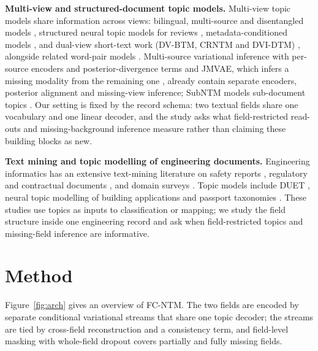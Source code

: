 \documentclass[Journal,letterpaper,NoLists]{ascelike-new}
\newcommand{\fcntm}{FC-NTM}
\begin{document}
\noindent\textbf{Multi-view and structured-document topic models.} Multi-view topic models share information across views: bilingual, multi-source and disentangled
models \cite{kurle2019multisource,zhang2017robust,pergola2021disentangled,liu2022dualview},
structured neural topic models for reviews \cite{esmaeili2019structured}, metadata-conditioned
models \cite{card2018metadata,roberts2019stm}, and dual-view short-text work (DV-BTM, CRNTM and
DVI-DTM) \cite{liu2022dualview,crntm2020,dvidtm2026}, alongside related word-pair models
\cite{relationalbtm2018,sparsebtm2021}. Multi-source variational inference with per-source encoders
and posterior-divergence terms \cite{kurle2019multisource} and JMVAE, which infers a missing
modality from the remaining one \cite{suzuki2017jmvae}, already contain separate encoders,
posterior alignment and missing-view inference; SubNTM models sub-document topics
\cite{nguyen2026subntm}. Our setting is fixed by the record schema: two textual fields share one
vocabulary and one linear decoder, and the study asks what field-restricted read-outs and
missing-background inference measure rather than claiming these building blocks as new.

\noindent\textbf{Text mining and topic modelling of engineering documents.} Engineering informatics has an extensive text-mining literature on safety reports
\cite{civilsafety2015,civilaccident2018}, regulatory and contractual documents
\cite{compliance2013,ontology2015,contract2022,risknlp2023}, and domain surveys
\cite{civilnlp2021,civilnlp2023}. Topic models include DUET \cite{duet2019}, neural topic modelling
of building applications \cite{civiltopic2024} and passport taxonomies \cite{passport2026}. These
studies use topics as inputs to classification or mapping; we study the field structure inside one
engineering record and ask when field-restricted topics and missing-field inference are
informative.

\section{Method}

Figure~\ref{fig:arch} gives an overview of \fcntm{}. The two fields are encoded by separate
conditional variational streams that share one topic decoder; the streams are tied by cross-field
reconstruction and a consistency term, and field-level masking with whole-field dropout covers
partially and fully missing fields.
\end{document}
